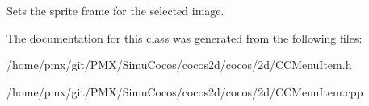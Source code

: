 Sets the sprite frame for the selected image. 

The documentation for this class was generated from the following files\+:\begin{DoxyCompactItemize}
\item 
/home/pmx/git/\+P\+M\+X/\+Simu\+Cocos/cocos2d/cocos/2d/C\+C\+Menu\+Item.\+h\item 
/home/pmx/git/\+P\+M\+X/\+Simu\+Cocos/cocos2d/cocos/2d/C\+C\+Menu\+Item.\+cpp\end{DoxyCompactItemize}
